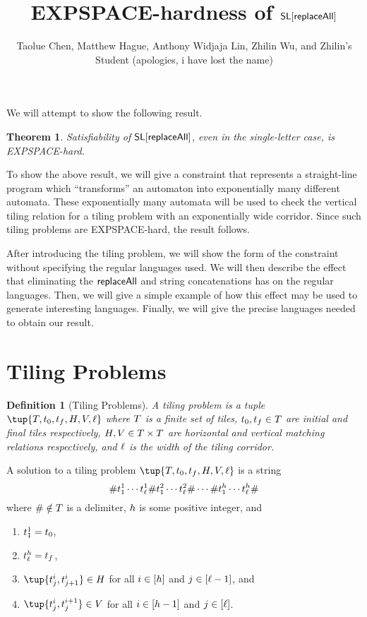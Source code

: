 \documentclass{article}
\title{EXPSPACE-hardness of $\mathsf{SL}[\mathsf{replaceAll}]$}
\author{Taolue Chen, Matthew Hague, Anthony Widjaja Lin, Zhilin Wu, and Zhilin's Student (apologies, i have lost the name)}
\date{}
\newtheorem{theorem}{Theorem}
\newtheorem{definition}{Definition}
\begin{document}
\maketitle

We will attempt to show the following result.

\begin{theorem}
    Satisfiability of $\mathsf{SL}[\mathsf{replaceAll}]$, even in the single-letter case, is EXPSPACE-hard.
\end{theorem}

To show the above result, we will give a constraint that represents a straight-line program which ``transforms'' an automaton into exponentially many different automata.
These exponentially many automata will be used to check the vertical tiling relation for a tiling problem with an exponentially wide corridor.
Since such tiling problems are EXPSPACE-hard, the result follows.

After introducing the tiling problem, we will show the form of the constraint without specifying the regular languages used.
We will then describe the effect that eliminating the $\mathsf{replaceAll}$ and string concatenations has on the regular languages.
Then, we will give a simple example of how this effect may be used to generate interesting languages.
Finally, we will give the precise languages needed to obtain our result.

\section{Tiling Problems}

\begin{definition}[Tiling Problems]
    A \emph{tiling problem} is a tuple
    $\tup{\tiles, \inittile, \fintile, \hcons, \vcons, \width}$
    where
        $T$ is a finite set of tiles,
        $t_0, t_f \in T$ are initial and final tiles respectively,
        $H, V \in T \times T$
            are horizontal and vertical matching relations respectively, and
        $\ell$ is the width of the tiling corridor.
\end{definition}

A solution to a tiling problem
$\tup{\tiles, \inittile, \fintile, \hcons, \vcons, \width}$
is a string
\[
    \# t^1_1 \cdots t^1_\ell
    \# t^2_1 \cdots t^2_\ell
    \# \cdots
    \# t^h_1 \cdots t^h_\ell
    \#
\]
where $\# \notin T$ is a delimiter, $h$ is some positive integer, and
\begin{enumerate}
\item
    $t^1_1 = t_0$,
\item
    $t^h_\ell = t_f$,
\item
    $\tup{\tile^i_j, \tile^i_{j+1}} \in \hcons$
    for all
    $i \in [h]$
    and
    $j \in [\ell - 1]$, and
\item
    $\tup{\tile^i_j, \tile^{i+1}_j} \in \vcons$
    for all
    $i \in [h - 1]$
    and
    $j \in [\ell]$.
\end{enumerate}
\end{document}
